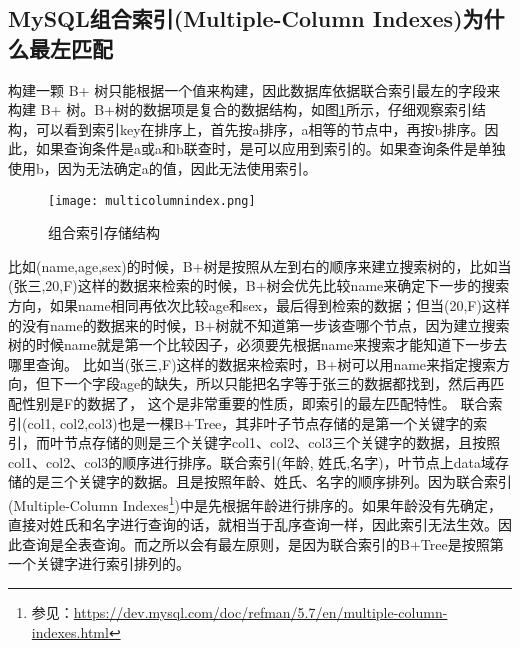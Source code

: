 \documentclass[../../../interview-questions.tex]{subfiles}
\begin{document}
\subsection{MySQL组合索引(Multiple-Column Indexes)为什么最左匹配}

构建一颗 B+ 树只能根据一个值来构建，因此数据库依据联合索引最左的字段来构建 B+ 树。B+树的数据项是复合的数据结构，如图\ref{fig:multicolumnindex}所示，仔细观察索引结构，可以看到索引key在排序上，首先按a排序，a相等的节点中，再按b排序。因此，如果查询条件是a或a和b联查时，是可以应用到索引的。如果查询条件是单独使用b，因为无法确定a的值，因此无法使用索引。

\begin{figure}[htbp]
    \centering
    \texttt{[image: multicolumnindex.png]}
    \caption{组合索引存储结构}
    \label{fig:multicolumnindex}
\end{figure}

比如(name,age,sex)的时候，B+树是按照从左到右的顺序来建立搜索树的，比如当(张三,20,F)这样的数据来检索的时候，B+树会优先比较name来确定下一步的搜索方向，如果name相同再依次比较age和sex，最后得到检索的数据；但当(20,F)这样的没有name的数据来的时候，B+树就不知道第一步该查哪个节点，因为建立搜索树的时候name就是第一个比较因子，必须要先根据name来搜索才能知道下一步去哪里查询。
比如当(张三,F)这样的数据来检索时，B+树可以用name来指定搜索方向，但下一个字段age的缺失，所以只能把名字等于张三的数据都找到，然后再匹配性别是F的数据了， 这个是非常重要的性质，即索引的最左匹配特性。
联合索引(col1, col2,col3)也是一棵B+Tree，其非叶子节点存储的是第一个关键字的索引，而叶节点存储的则是三个关键字col1、col2、col3三个关键字的数据，且按照col1、col2、col3的顺序进行排序。联合索引(年龄, 姓氏,名字)，叶节点上data域存储的是三个关键字的数据。且是按照年龄、姓氏、名字的顺序排列。因为联合索引(Multiple-Column Indexes\footnote{参见：\url{https://dev.mysql.com/doc/refman/5.7/en/multiple-column-indexes.html}})中是先根据年龄进行排序的。如果年龄没有先确定，直接对姓氏和名字进行查询的话，就相当于乱序查询一样，因此索引无法生效。因此查询是全表查询。而之所以会有最左原则，是因为联合索引的B+Tree是按照第一个关键字进行索引排列的。
\end{document}

